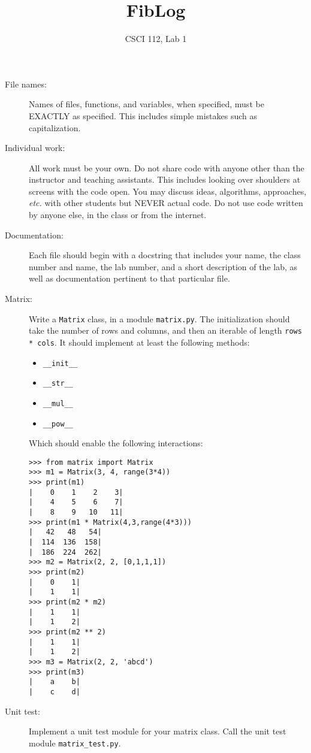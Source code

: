 \documentclass{article}
\title{FibLog}
\author{CSCI 112, Lab 1}
\date{}
\newcommand{\bi}{\begin{itemize}}
\newcommand{\li}{\item}
\newcommand{\ei}{\end{itemize}}
\begin{document}
\sloppy

\maketitle

\begin{description} 
\item[File names:]  Names of files, functions, and variables, 
when specified,
must be EXACTLY as specified.  This includes simple mistakes such
as capitalization.

\item[Individual work:]  All work must be your own.  Do not share
code with anyone other than the instructor and teaching assistants.
This includes looking over shoulders at screens with the code open.
You may discuss ideas, algorithms, approaches, {\em etc.} with
other students but NEVER actual code.  Do not use code
written by anyone else, in the class or from the internet.

\item[Documentation:] Each file should begin with a docstring
that includes your name, the class number and name, the lab
number, and  
a short description of the lab, as well as documentation pertinent
to that particular file.

\item[Matrix:]  Write a \lstinline{Matrix} class, in a module \lstinline{matrix.py}.
The initialization should take the number of rows and columns,
and then an iterable of length \lstinline{rows * cols}.
  It should 
implement at least the following methods:
\bi
\li \lstinline{__init__}
\li \lstinline{__str__}
\li \lstinline{__mul__}
\li \lstinline{__pow__}
\ei
Which should enable the following interactions:
\begin{lstlisting}
>>> from matrix import Matrix
>>> m1 = Matrix(3, 4, range(3*4))
>>> print(m1)
|    0    1    2    3|
|    4    5    6    7|
|    8    9   10   11|
>>> print(m1 * Matrix(4,3,range(4*3)))
|   42   48   54|
|  114  136  158|
|  186  224  262|
>>> m2 = Matrix(2, 2, [0,1,1,1])
>>> print(m2)
|    0    1|
|    1    1|
>>> print(m2 * m2)
|    1    1|
|    1    2|
>>> print(m2 ** 2)
|    1    1|
|    1    2|
>>> m3 = Matrix(2, 2, 'abcd')
>>> print(m3)
|    a    b|
|    c    d|
\end{lstlisting}

\item[Unit test:]  Implement a unit test module for your matrix class. Call
the unit test module \lstinline{matrix_test.py}.


\end{description}
\end{document}
